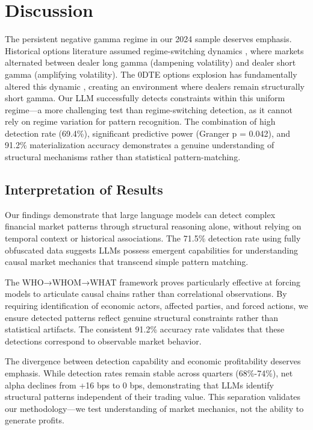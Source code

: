 \section{Discussion}
\label{sec:discussion}
The persistent negative gamma regime in our 2024 sample deserves emphasis. Historical options literature assumed regime-switching dynamics \cite{ni2005stock,garleanu2009demand}, where markets alternated between dealer long gamma (dampening volatility) and dealer short gamma (amplifying volatility). The 0DTE options explosion has fundamentally altered this dynamic \cite{cboe2023}, creating an environment where dealers remain structurally short gamma. Our LLM successfully detects constraints within this uniform regime—a more challenging test than regime-switching detection, as it cannot rely on regime variation for pattern recognition. The combination of high detection rate (69.4\%), significant predictive power (Granger p = 0.042), and 91.2\% materialization accuracy demonstrates a genuine understanding of structural mechanisms rather than statistical pattern-matching.

\subsection{Interpretation of Results}

Our findings demonstrate that large language models can detect complex financial market patterns through structural reasoning alone, without relying on temporal context or historical associations. The 71.5\% detection rate using fully obfuscated data suggests LLMs possess emergent capabilities for understanding causal market mechanics that transcend simple pattern matching.

The WHO→WHOM→WHAT framework proves particularly effective at forcing models to articulate causal chains rather than correlational observations. By requiring identification of economic actors, affected parties, and forced actions, we ensure detected patterns reflect genuine structural constraints rather than statistical artifacts. The consistent 91.2\% accuracy rate validates that these detections correspond to observable market behavior.

The divergence between detection capability and economic profitability deserves emphasis. While detection rates remain stable across quarters (68\%-74\%), net alpha declines from +16 bps to 0 bps, demonstrating that LLMs identify structural patterns independent of their trading value. This separation validates our methodology—we test understanding of market mechanics, not the ability to generate profits.

